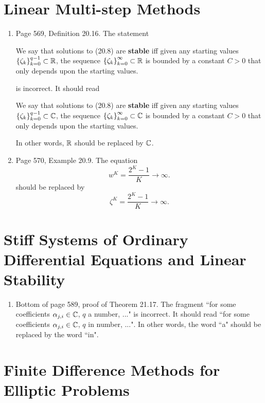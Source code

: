 \documentclass{book}
\begin{document}
\chapter{Linear Multi-step Methods}

	\begin{enumerate}
	
	\item
Page 569, Definition 20.16. The statement 

\qquad We say that solutions to (20.8) are \textbf{stable} iff given any starting values $\left\{\zeta_k \right\}_{k=0}^{q-1} \subset \mathbb R$, the sequence $\left\{\zeta_k \right\}_{k=0}^\infty \subset \mathbb R$ is bounded by a constant $C>0$ that only depends upon the starting values.

is incorrect. It should read

\qquad We say that solutions to (20.8) are \textbf{stable} iff given any starting values $\left\{\zeta_k \right\}_{k=0}^{q-1} \subset \mathbb C$, the sequence $\left\{\zeta_k \right\}_{k=0}^\infty \subset \mathbb C$ is bounded by a constant $C>0$ that only depends upon the starting values.

In other words, $\mathbb R$ should be replaced by $\mathbb C$.

	\item
Page 570, Example 20.9. The equation   
	\[
w^K = \frac{2^K-1}{K} \to \infty.
	\]
should be replaced by
	\[
\zeta^K = \frac{2^K-1}{K} \to \infty.
	\]
	\end{enumerate}
	
	\chapter{Stiff Systems of Ordinary Differential Equations and Linear Stability}
	
	\begin{enumerate}
	\item 
Bottom of page 589, proof of Theorem 21.17. The fragment ``for some coefficients $\alpha_{j,i}\in\mathbb C$, $q$ a number, ..." is incorrect. It should read ``for some coefficients $\alpha_{j,i}\in\mathbb C$, $q$ in number, ...". In other words, the word ``a" should be replaced by the word ``in".
	\end{enumerate}
	
	\setcounter{chapter}{23}

\chapter{Finite Difference Methods for Elliptic Problems}
\end{document}
